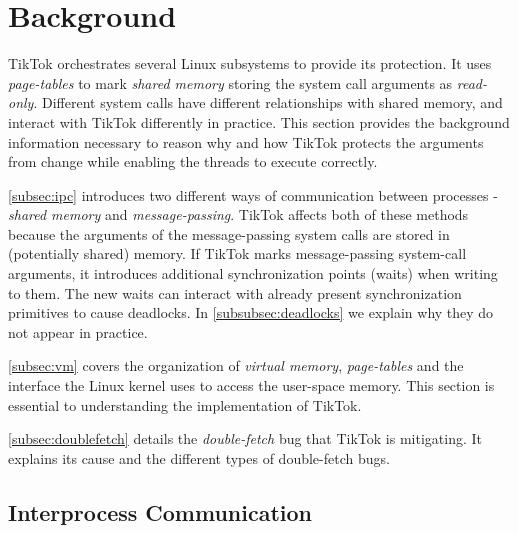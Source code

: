 \documentclass[conference]{IEEEtran}
\newcommand{\sysname}{TikTok}
\begin{document}
\section{Background}
\label{sec:background}

\sysname{} orchestrates several Linux subsystems to provide its protection. It uses
\emph{page-tables} to mark \emph{shared memory} storing the system call
arguments as \emph{read-only}. Different system calls have different
relationships with shared memory, and interact with \sysname{} differently in
practice. This section provides the background information necessary to reason
why and how \sysname{} protects the arguments from change while enabling the threads to
execute correctly.

\autoref{subsec:ipc} introduces two different ways of communication between
processes - \emph{shared memory} and \emph{message-passing}. \sysname{} affects
both of these methods because the arguments of the message-passing system calls
are stored in (potentially shared) memory. If \sysname{} marks message-passing
system-call arguments, it introduces additional synchronization points (waits)
when writing to them. The new waits can interact with already present
synchronization primitives to cause deadlocks. In \autoref{subsubsec:deadlocks} we
explain why they do not appear in practice.

\autoref{subsec:vm} covers the organization of \emph{virtual memory},
\emph{page-tables} and the interface the Linux kernel uses to access the
user-space memory. This section is essential to understanding the implementation
of \sysname.

\autoref{subsec:doublefetch} details the \emph{double-fetch} bug that \sysname{}
is mitigating. It explains its cause and the different types of double-fetch bugs.


\subsection{Interprocess Communication}
\label{subsec:ipc}
\end{document}
